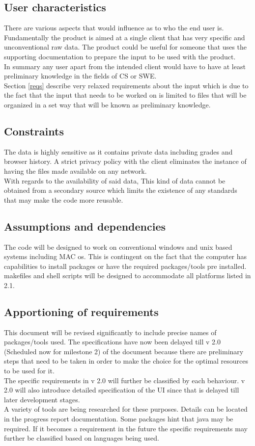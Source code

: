 \documentclass[12pt]{article}
\begin{document}
	\subsection{User characteristics}
	There are various aspects that would influence as to who the end user is. Fundamentally the product is aimed at a single client that has very specific and unconventional raw data. The product could be useful for someone that uses the supporting documentation to prepare the input to be used with the product. \\
	In summary any user apart from the intended client would have to have at least preliminary knowledge in the fields of CS or SWE. \\ 
	Section \ref{reqs} describe very relaxed requirements about the input which is due to the fact that the input that needs to be worked on is limited to files that will be organized in a set way that will be known as preliminary knowledge.
	\subsection{Constraints}
	The data is highly sensitive as it contains private data including grades and browser history. A strict privacy policy with the client eliminates the instance of having the files made available on any network. \\
	With regards to the availability of said data, This kind of data cannot be obtained from a secondary source which limits the existence of any standards that may make the code more reusable.
	\subsection{Assumptions and dependencies}
	The code will be designed to work on conventional windows and unix based systems including MAC os. This is contingent on the fact that the computer has capabilities to install packages or have the required packages/tools pre installed. \\
	makefiles and shell scripts will be designed to accommodate all platforms listed in 2.1.
	\subsection{Apportioning of requirements}
	This document will be revised significantly to include precise names of packages/tools used. The specifications have now been delayed till v 2.0 (Scheduled now for milestone 2) of the document because there are preliminary steps that need to be taken in order to make the choice for the optimal resources to be used for it.\\ 
	The specific requirements in v 2.0 will further be classified by each behaviour. v 2.0 will also introduce detailed specification of the UI since that is delayed till later development stages. \\
	A variety of tools are being researched for these purposes. Details can be located in the progress report documentation. Some packages hint that java may be required. If it becomes a requirement in the future the specific requirements may further be classified based on languages being used. 
	\pagebreak
\end{document}
